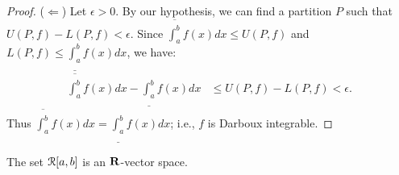 \documentclass[10pt,twoside,openany]{memoir}
\begin{document}
\begin{proof}
            ($\Leftarrow$) Let $\epsilon > 0$. By our hypothesis, we can find a partition $P$ such that $U(P,f) - L(P,f) < \epsilon$. Since $\overline{\int_a^b}f(x)dx \leq U(P,f)$ and $L(P,f) \leq \underline{\int_a^b}f(x)dx$, we have:
                \begin{equation*}
                \begin{split}
                    \overline{\int_a^b}f(x)dx - \underline{\int_a^b}f(x)dx 
                    & \leq U(P,f) - L(P,f) < \epsilon.
                \end{split}
                \end{equation*}
            Thus $\overline{\int_a^b}f(x)dx = \underline{\int_a^b}f(x)dx$; i.e., $f$ is Darboux integrable. 
        \end{proof}

    \begin{proposition}\label{prop:4}
        The set $\mathcal{R}[a,b]$ is an $\mathbf{R}$-vector space.
    \end{proposition}
\end{document}
